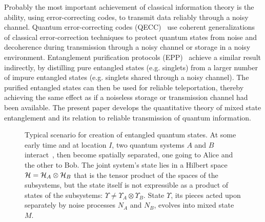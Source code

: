 Probably the most important achievement of classical information theory
is the ability, using error-correcting codes, to transmit data reliably
through a noisy channel.  Quantum error-correcting codes
(QECC)~\cite{ChuangLaf,shellgame,CS,Steane,Laflamme,EM,Sam,balance,newest} use
coherent generalizations of classical error-correction techniques to
protect quantum states from noise and decoherence during transmission
through a noisy channel or storage in a noisy environment.  Entanglement
purification protocols (EPP)~\cite{purification} achieve a similar
result indirectly, by distilling pure entangled states (e.g. singlets)
from a larger number of impure entangled states (e.g. singlets shared
through a noisy channel).  The purified entangled states can then be
used for reliable teleportation, thereby achieving the same effect as if
a noiseless storage or transmission channel had been available.  The
present paper develops the quantitative theory of mixed state
entanglement and its relation to reliable transmission of quantum
information.
 
\begin{figure}[htbp]
\centerline{}
\caption[Typical scenario for creation of entangled quantum states]
{Typical scenario for creation of entangled quantum states.
At some early time and at location $I$, two quantum
systems $A$ and $B$ interact~\protect\cite{foot1}, then become 
spatially separated, one
going to Alice and the other to Bob.  The joint system's state lies in
a Hilbert space ${\cal H}= {\cal H}_A\otimes{\cal H}_B$ that is the
tensor product of the spaces of the subsystems, but the state itself
is not expressible as a product of states of the subsystems:
$\Upsilon\neq \Upsilon_A\otimes\Upsilon_B$. 
State $\Upsilon$, its pieces acted upon
separately by noise processes $N_A$ and $N_B$, evolves into mixed
state $M$.} 
\label{f1}
\end{figure}
 
